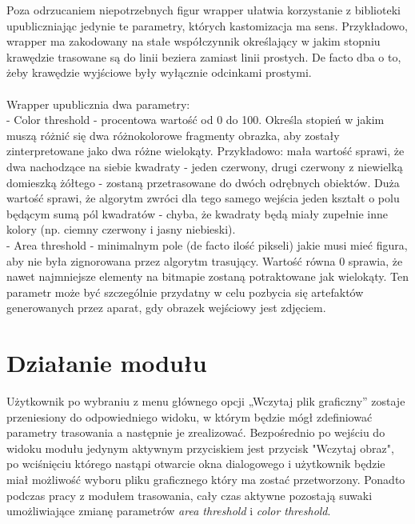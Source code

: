 \documentclass{article}
\let\oldsection\section
\renewcommand\section{\clearpage\oldsection} %
\begin{document}
Poza odrzucaniem niepotrzebnych figur wrapper ułatwia korzystanie z biblioteki upubliczniając jedynie te parametry, których kastomizacja ma sens. Przykładowo, wrapper ma zakodowany na stałe współczynnik określający w jakim stopniu krawędzie trasowane są do linii beziera zamiast linii prostych. De facto dba o to, żeby krawędzie wyjściowe były wyłącznie odcinkami prostymi.
\\\\Wrapper upublicznia dwa parametry:
\\- Color threshold - procentowa wartość od 0 do 100. Określa stopień w jakim muszą różnić się dwa różnokolorowe fragmenty obrazka, aby zostały zinterpretowane jako dwa różne wielokąty. Przykładowo: mała wartość sprawi, że dwa nachodzące na siebie kwadraty - jeden czerwony, drugi czerwony z niewielką domieszką żółtego - zostaną przetrasowane do dwóch odrębnych obiektów. Duża wartość sprawi, że algorytm zwróci dla tego samego wejścia jeden kształt o polu będącym sumą pól kwadratów - chyba, że kwadraty będą miały zupełnie inne kolory (np. ciemny czerwony i jasny niebieski).
\\- Area threshold - minimalnym pole (de facto ilość pikseli) jakie musi mieć figura, aby nie była zignorowana przez algorytm trasujący. Wartość równa 0 sprawia, że nawet najmniejsze elementy na bitmapie zostaną potraktowane jak wielokąty. Ten parametr może być szczególnie przydatny w celu pozbycia się artefaktów generowanych przez aparat, gdy obrazek wejściowy jest zdjęciem.

\section{Działanie modułu}
	
Użytkownik po wybraniu z menu głównego opcji „Wczytaj plik graficzny” zostaje przeniesiony do odpowiedniego widoku, w którym będzie mógł zdefiniować parametry trasowania a następnie je zrealizować. Bezpośrednio po wejściu do widoku modułu jedynym aktywnym przyciskiem jest przycisk "Wczytaj obraz", po wciśnięciu którego nastąpi otwarcie okna dialogowego i użytkownik będzie miał możliwość wyboru pliku graficznego który ma zostać przetworzony. Ponadto podczas pracy z modułem trasowania, cały czas aktywne pozostają suwaki umożliwiające zmianę parametrów \textit{area threshold} i \textit{color threshold}.
\end{document}
